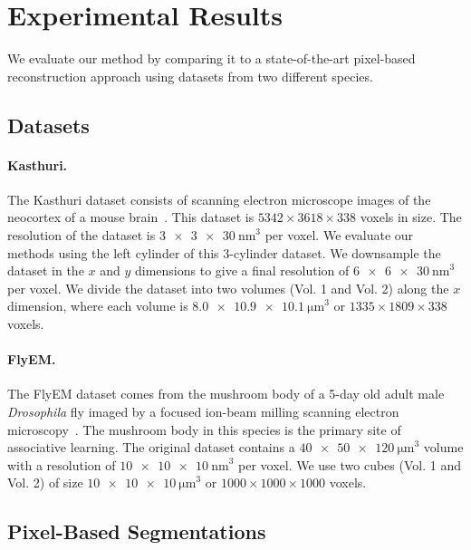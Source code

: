 \section{Experimental Results}

We evaluate our method by comparing it to a state-of-the-art pixel-based reconstruction approach using datasets from two different species.

\subsection{Datasets}
\label{sec:dataset}

\paragraph{Kasthuri.}
The Kasthuri dataset consists of scanning electron microscope images of the neocortex of a mouse brain~\cite{kasthuri2015saturated}. This dataset is $5342 \times 3618 \times 338$ voxels in size. The resolution of the dataset is $\SI[product-units=single]{3 x 3 x 30}{\nano\meter}^3$ per voxel. We evaluate our methods using the left cylinder of this 3-cylinder dataset. We downsample the dataset in the $x$ and $y$ dimensions to give a final resolution of $\SI[product-units=single]{6 x 6 x 30}{\nano\meter}^3$ per voxel. We divide the dataset into two volumes (Vol. 1 and Vol. 2) along the $x$ dimension, where each volume is $\SI[product-units=single]{8.0 x 10.9 x 10.1}{\micro\meter}^3$ or $1335 \times 1809 \times 338$ voxels.

\paragraph{FlyEM.}
The FlyEM dataset comes from the mushroom body of a 5-day old adult male \textit{Drosophila} fly imaged by a focused ion-beam milling scanning electron microscopy~\cite{takemura2017connectome}. The mushroom body in this species is the primary site of associative learning. The original dataset contains a $\SI[product-units=single]{40 x 50 x 120}{\micro\meter}^3$ volume with a resolution of $\SI[product-units=single]{10 x 10 x 10}{\nano\meter}^3$ per voxel. We use two cubes (Vol. 1 and Vol. 2) of size $\SI[product-units=single]{10 x 10 x 10}{\micro\meter}^3$ or $1000 \times 1000 \times 1000$ voxels.

\subsection{Pixel-Based Segmentations}
\label{sec:neuroproof}

